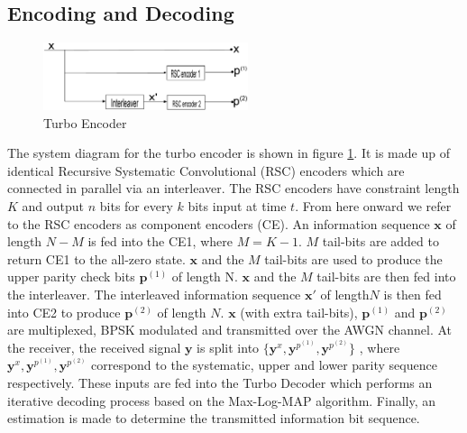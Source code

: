 \documentclass[twoside]{jarticle}
\begin{document}
\subsection{Encoding and Decoding}
\vspace{-2mm}
\begin{center}
\begin{figure}[h!]
\includegraphics[width=6cm]{TurboEncoder.eps}
\caption{Turbo Encoder}
\label{TC}
\end{figure}
\end{center}
\vspace{-6mm}
The system diagram for the turbo encoder is shown in figure \ref{TC}.
 It is made up of identical Recursive Systematic Convolutional (RSC) encoders which 
 are connected
  in parallel via an interleaver. The RSC encoders have constraint length $K$ and output
  $n$ bits for every $k$ bits input at time $t$.
  From here onward we refer to the RSC encoders as component 
encoders (CE). An information sequence $\mathbf{x} $ of length $N-M$ is fed into the CE1, where $M=K-1$. $M$ tail-bits are added to return CE1 to the all-zero state.  $\mathbf{x}$ and the $M$ tail-bits are used to produce the upper parity check bits  
$\mathbf{p}^{(1)}$ of length N. $\mathbf{x}$ and the $M$ tail-bits are then fed into the interleaver. The interleaved information sequence $\mathbf{x'}$ of length$N$ is then fed into CE2 to produce $\mathbf{p}^{(2)} $ of length $N$. $\mathbf{x}$ (with extra tail-bits), $\mathbf{p}^{(1)}$
 and $\mathbf{p}^{(2)}$ are multiplexed, BPSK modulated and transmitted over the
 AWGN channel. At the receiver, the received signal  $\mathbf{y}$ is split into 
  $\{\mathbf{y}^x,\mathbf{y}^{p^{(1)}},\mathbf{y}^{p^{(2)}}\}$ 
 , where $\mathbf{y}^x,\mathbf{y}^{p^{(1)}},\mathbf{y}^{p^{(2)}}$
    correspond to the systematic, upper and lower parity sequence respectively. These inputs are fed into the Turbo Decoder which performs an iterative decoding process based on the Max-Log-MAP algorithm. Finally, an estimation is made to determine the transmitted information bit sequence.
    
\end{document}
